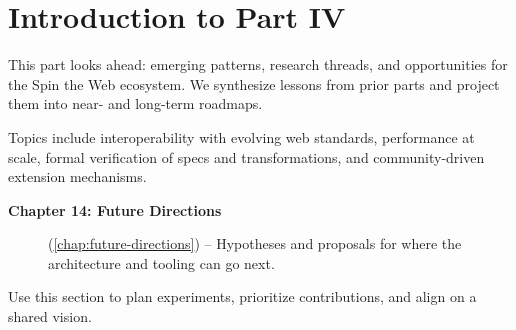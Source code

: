 
\chapter*{Introduction to Part IV}
\label{part:future}

This part looks ahead: emerging patterns, research threads, and opportunities for the Spin the Web ecosystem. We synthesize lessons from prior parts and project them into near- and long-term roadmaps.

Topics include interoperability with evolving web standards, performance at scale, formal verification of specs and transformations, and community-driven extension mechanisms.

\begin{description}
	\item[\textbf{Chapter 14: Future Directions}] (\cref{chap:future-directions}) -- Hypotheses and proposals for where the architecture and tooling can go next.
\end{description}

Use this section to plan experiments, prioritize contributions, and align on a shared vision.
